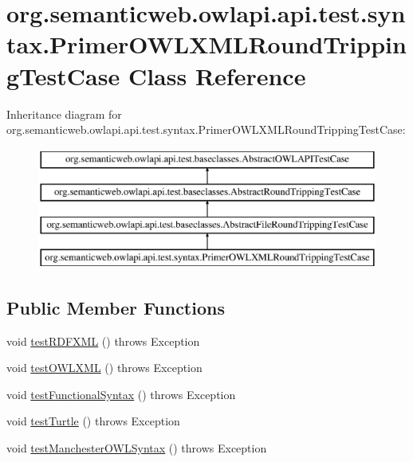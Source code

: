 \hypertarget{classorg_1_1semanticweb_1_1owlapi_1_1api_1_1test_1_1syntax_1_1_primer_o_w_l_x_m_l_round_tripping_test_case}{\section{org.\-semanticweb.\-owlapi.\-api.\-test.\-syntax.\-Primer\-O\-W\-L\-X\-M\-L\-Round\-Tripping\-Test\-Case Class Reference}
\label{classorg_1_1semanticweb_1_1owlapi_1_1api_1_1test_1_1syntax_1_1_primer_o_w_l_x_m_l_round_tripping_test_case}
}
Inheritance diagram for org.\-semanticweb.\-owlapi.\-api.\-test.\-syntax.\-Primer\-O\-W\-L\-X\-M\-L\-Round\-Tripping\-Test\-Case\-:\begin{figure}[H]
\begin{center}
\leavevmode
\includegraphics[height=4.000000cm]{classorg_1_1semanticweb_1_1owlapi_1_1api_1_1test_1_1syntax_1_1_primer_o_w_l_x_m_l_round_tripping_test_case}
\end{center}
\end{figure}
\subsection*{Public Member Functions}
\begin{DoxyCompactItemize}
\item 
void \hyperlink{classorg_1_1semanticweb_1_1owlapi_1_1api_1_1test_1_1syntax_1_1_primer_o_w_l_x_m_l_round_tripping_test_case_ad99b75b846e6f6e33d5e742878b2f070}{test\-R\-D\-F\-X\-M\-L} ()  throws Exception 
\item 
void \hyperlink{classorg_1_1semanticweb_1_1owlapi_1_1api_1_1test_1_1syntax_1_1_primer_o_w_l_x_m_l_round_tripping_test_case_a4804610101acb28175a98f272646aaf7}{test\-O\-W\-L\-X\-M\-L} ()  throws Exception 
\item 
void \hyperlink{classorg_1_1semanticweb_1_1owlapi_1_1api_1_1test_1_1syntax_1_1_primer_o_w_l_x_m_l_round_tripping_test_case_a16599db839e8245cca3c327d1a76c2d6}{test\-Functional\-Syntax} ()  throws Exception 
\item 
void \hyperlink{classorg_1_1semanticweb_1_1owlapi_1_1api_1_1test_1_1syntax_1_1_primer_o_w_l_x_m_l_round_tripping_test_case_ad766feb2c56c251d6540e5ce08a053ba}{test\-Turtle} ()  throws Exception 
\item 
void \hyperlink{classorg_1_1semanticweb_1_1owlapi_1_1api_1_1test_1_1syntax_1_1_primer_o_w_l_x_m_l_round_tripping_test_case_af882c8d7047902ad8a503a6efe5d86cb}{test\-Manchester\-O\-W\-L\-Syntax} ()  throws Exception 
\end{DoxyCompactItemize}
